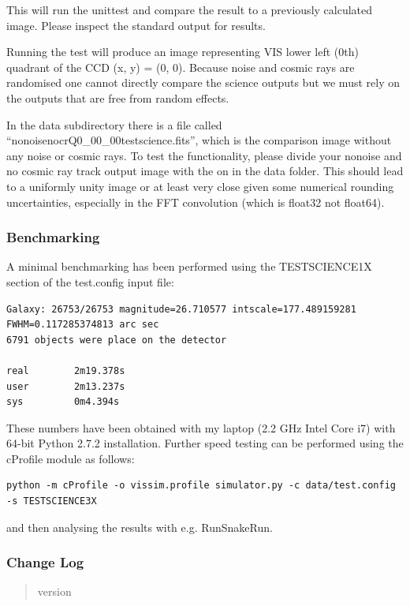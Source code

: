 \documentclass[a4paper,11pt,english]{sphinxmanual}
\begin{document}
This will run the unittest and compare the result to a previously calculated image.
Please inspect the standard output for results.

Running the test will produce an image representing VIS lower left (0th) quadrant of the CCD (x, y) = (0, 0). Because
noise and cosmic rays are randomised one cannot directly compare the science
outputs but we must rely on the outputs that are free from random effects.

In the data subdirectory there is a file called ``nonoisenocrQ0\_00\_00testscience.fits'',
which is the comparison image without any noise or cosmic rays. To test the functionality,
please divide your nonoise and no cosmic ray track output image with the on in the data
folder. This should lead to a uniformly unity image or at least very close given some
numerical rounding uncertainties, especially in the FFT convolution (which is float32 not
float64).


\subsubsection{Benchmarking}
\label{simulator:benchmarking}
A minimal benchmarking has been performed using the TESTSCIENCE1X section of the test.config input file:

\begin{Verbatim}[commandchars=\\\{\}]
Galaxy: 26753/26753 magnitude=26.710577 intscale=177.489159281 FWHM=0.117285374813 arc sec
6791 objects were place on the detector

real        2m19.378s
user        2m13.237s
sys         0m4.394s
\end{Verbatim}

These numbers have been obtained with my laptop (2.2 GHz Intel Core i7) with
64-bit Python 2.7.2 installation. Further speed testing can be performed using the cProfile module
as follows:

\begin{Verbatim}[commandchars=\\\{\}]
python -m cProfile -o vissim.profile simulator.py -c data/test.config -s TESTSCIENCE3X
\end{Verbatim}

and then analysing the results with e.g. RunSnakeRun.


\subsubsection{Change Log}
\label{simulator:change-log}\begin{quote}\begin{description}
\item[{version}] 

\end{description}\end{quote}
\end{document}
